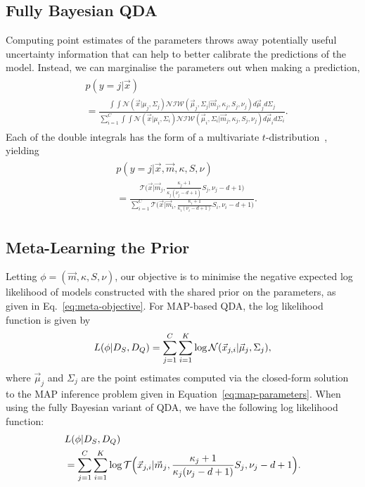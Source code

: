 \documentclass[10pt,twocolumn,letterpaper]{article}
\newcommand{\NIW}{\mathcal{NIW}}
\newcommand{\Gauss}{\mathcal{N}}
\newcommand{\T}{\mathcal{T}}
\begin{document}
\subsection{Fully Bayesian QDA}\label{sec:mqdaFB}
Computing point estimates of the parameters throws away potentially useful uncertainty information that can help to better calibrate the predictions of the model. Instead, we can marginalise the parameters out when making a prediction,
\begin{align}
\begin{split}
    &p(y=j | \vec x) \\
    &= \frac{\int \int \Gauss(\vec x | \mu_j, \Sigma_j) \NIW(\vec \mu_j, \Sigma_j | \vec m_j, \kappa_j, S_j, \nu_j) d\vec \mu_j d \Sigma_j}{\sum_{i=1}^C \int \int \Gauss(\vec x | \mu_i, \Sigma_i) \NIW(\vec \mu_i, \Sigma_i | \vec m_j, \kappa_j, S_j, \nu_j) d\vec \mu_i d \Sigma_i}.
\end{split}
\end{align}
Each of the double integrals has the form of a multivariate $t$-distribution~\cite{murphy2012machine}, yielding
\begin{align}
\begin{split}
    &p(y=j | \vec x, \vec m, \kappa, S, \nu) \\
    &= \frac{\T \Big (\vec x | \vec m_j, \frac{\kappa_j + 1}{\kappa_j(\nu_j - d + 1)}S_j, \nu_j - d + 1 \Big )}{\sum_{i=1}^C \T \Big (\vec x | \vec m_i, \frac{\kappa_i + 1}{\kappa_i(\nu_i - d + 1)}S_i, \nu_i - d + 1 \Big )}.\label{eq:studentt-test}
\end{split}
\end{align}

\subsection{Meta-Learning the Prior}
Letting $\phi = (\vec m, \kappa, S, \nu)$, our objective is to minimise the negative expected log likelihood of models constructed with the shared prior on the parameters, as given in Eq.~\ref{eq:meta-objective}. For  MAP-based QDA, the log likelihood function is given by
\begin{equation}
\label{eq:map-likelihood}
    L(\phi | D_S, D_Q) = \sum_{j=1}^C \sum_{i=1}^K \textup{log} \, \Gauss(\vec x_{j,i} | \vec \mu_j, \Sigma_j),
\end{equation}
where $\vec \mu_j$ and $\Sigma_j$ are the point estimates computed via the closed-form solution to the MAP inference problem given in Equation~\ref{eq:map-parameters}. When using the fully Bayesian variant of QDA, we have the following log likelihood function:
\begin{align}
\begin{split}
\label{eq:full-likelihood}
    &L(\phi | D_S, D_Q) \\
    &= \sum_{j=1}^C \sum_{i=1}^K \textup{log} \, \T \Big (\vec x_{j,i} | \vec m_j, \frac{\kappa_j + 1}{\kappa_j(\nu_j - d + 1)}S_j, \nu_j - d + 1 \Big ).
\end{split}
\end{align}
\end{document}
